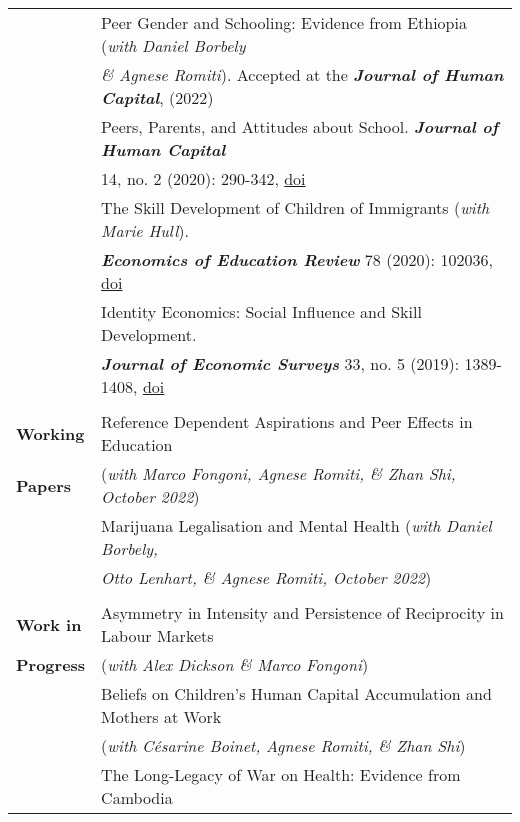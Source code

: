 \documentclass[11pt,a4paper]{article}
\begin{document}
\begin{longtable}{l l}
																				&  Peer Gender and Schooling: Evidence from Ethiopia (\textit{with Daniel Borbely}    \\ 
																				&  \textit{\& Agnese Romiti}). Accepted at the \textbf{\textit{Journal of Human Capital}}, (2022)    \\ 
\addlinespace
																				&  Peers, Parents, and Attitudes about School. \textbf{\textit{Journal of Human Capital}}  \\
																				&  14, no. 2 (2020): 290-342, \href{https://doi.org/10.1086/709507}{doi}  \\   
\addlinespace						
																				&  The Skill Development of Children of Immigrants (\textit{with Marie Hull}).  \\ 
																				&  \textbf{\textit{Economics of Education Review}} 78 (2020): 102036, \href{https://doi.org/10.1016/j.econedurev.2020.102036}{doi}    \\			
\addlinespace
																				&  Identity Economics: Social Influence and Skill Development.     \\
																				&  \textbf{\textit{Journal of Economic Surveys}} 33, no. 5 (2019): 1389-1408, \href{ https://doi.org/10.1111/joes.12331}{doi}		\\			
																				&   \\
\textbf{Working} 							  &  Reference Dependent Aspirations and Peer Effects in Education  \\ 
\textbf{Papers}										&  (\textit{with Marco Fongoni, Agnese Romiti, \& Zhan Shi, October 2022})   \\
\addlinespace
																							& Marijuana Legalisation and Mental Health (\textit{with Daniel Borbely,}  \\ 
																							& \textit{Otto Lenhart, \& Agnese Romiti, October 2022})   \\
																							&  \\
\textbf{Work in} 									&  Asymmetry in Intensity and Persistence of Reciprocity in Labour Markets  \\ 
\textbf{Progress}								&  (\textit{with Alex Dickson \& Marco Fongoni})   \\
\addlinespace										
																							& Beliefs on Children’s Human Capital Accumulation and Mothers at Work  \\
																							& (\textit{with C\'esarine Boinet, Agnese Romiti, \& Zhan Shi})  \\
\addlinespace
																							& The Long-Legacy of War on Health: Evidence from Cambodia \\

\end{longtable}
\end{document}
